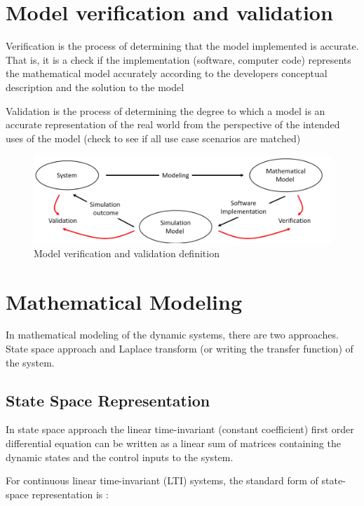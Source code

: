 \section{Model verification and validation}

Verification is the process of determining that the model implemented is accurate. That is, it is a check if the implementation (software, computer code) represents the mathematical model accurately according to the developers conceptual description and the solution to the model

Validation is the process of determining the degree to which a model is an accurate representation of the real world from the perspective of the intended uses of the model (check to see if all use case scenarios are matched)

\begin{figure}[h!]
	\centering
	\includegraphics[width=\linewidth]{Bilder/Model_Verification_Validation}
	\caption{Model verification and validation definition}
	\label{Fig_ModelVerificationValidation}
\end{figure}
\newpage

\section{Mathematical Modeling}

In mathematical modeling of the dynamic systems, there are two approaches. State space approach and Laplace transform (or writing the transfer function) of the system. 

\subsection{State Space Representation}

In state space approach the linear time-invariant (constant coefficient) first order differential equation can be written as a linear sum of matrices containing the dynamic states and the control inputs to the system. 

For continuous linear time-invariant (LTI) systems, the standard form of state-space representation is \cite{CTMS2019_Modeling}:

